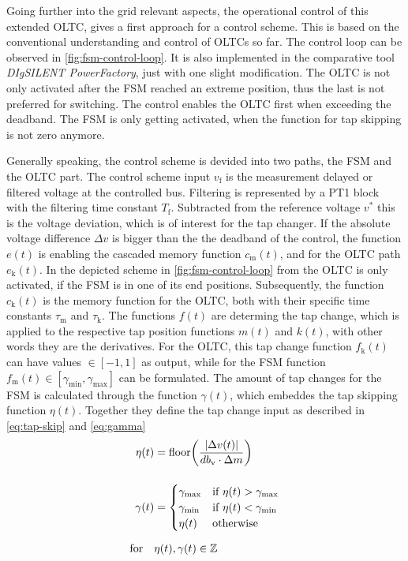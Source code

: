 Going further into the grid relevant aspects, the operational control of this extended \acs{OLTC}, \textcite{burlakin_2024} gives a first approach for a control scheme.
This is based on the conventional understanding and control of \acsp{OLTC} so far.
The control loop can be observed in \autoref{fig:fsm-control-loop}.
It is also implemented in the comparative tool \textit{DIgSILENT PowerFactory}, just with one slight modification.
The \acs{OLTC} is not only activated after the \acs{FSM} reached an extreme position, thus the last is not preferred for switching.
The control enables the \acs{OLTC} first when exceeding the deadband.
The \acs{FSM} is only getting activated, when the function for tap skipping is not zero anymore.

Generally speaking, the control scheme is devided into two paths, the \acs{FSM} and the \acs{OLTC} part.
The control scheme input $v_\mathrm{f}$ is the measurement delayed or filtered voltage at the controlled bus.
Filtering is represented by a PT1 block with the filtering time constant $T_\mathrm{f}$.
Subtracted from the reference voltage $v^*$ this is the voltage deviation, which is of interest for the tap changer. 
If the absolute voltage difference $\Delta v$ is bigger than the the deadband of the control, the function $e(t)$ is enabling the cascaded memory function $c_\mathrm{m}(t)$, and for the \acs{OLTC} path $e_\mathrm{k}(t)$.
In the depicted scheme in \autoref{fig:fsm-control-loop} from \autocite{burlakin_2024} the \acs{OLTC} is only activated, if the \acs{FSM} is in one of its end positions.
Subsequently, the function $c_\mathrm{k}(t)$ is the memory function for the \acs{OLTC}, both with their specific time constants $\tau_\mathrm{m}$ and $\tau_\mathrm{k}$.
The functions $f(t)$ are determing the tap change, which is applied to the respective tap position functions $m(t)$ and $k(t)$, with other words they are the derivatives.
For the \acs{OLTC}, this tap change function $f_\mathrm{k}(t)$ can have values $\in [-1,1]$ as output, while for the \acs{FSM} function $f_\mathrm{m}(t) \in [\gamma_\mathrm{min},\gamma_\mathrm{max}]$ can be formulated.
The amount of tap changes for the \acs{FSM} is calculated through the function $\gamma(t)$, which embeddes the tap skipping function $\eta(t)$.
Together they define the tap change input as described in \autoref{eq:tap-skip} and \autoref{eq:gamma}
\begin{align}
    \eta(t) &= \text{floor}\bigg( \frac{\vert \Delta v(t) \vert}{db_\mathrm{v} \cdot \Delta m} \bigg) \label{eq:tap-skip}\\[12pt]
    \gamma(t) &= \begin{cases}
        \gamma_\mathrm{max} & \text{if } \eta(t) > \gamma_\mathrm{max} \\
        \gamma_\mathrm{min} & \text{if } \eta(t) < \gamma_\mathrm{min} \\
        \eta(t) & \text{otherwise}
    \end{cases} \label{eq:gamma} \\[6pt]
    \text{for}\quad&\eta(t),\gamma(t) \in \mathbb{Z} \notag
\end{align}
